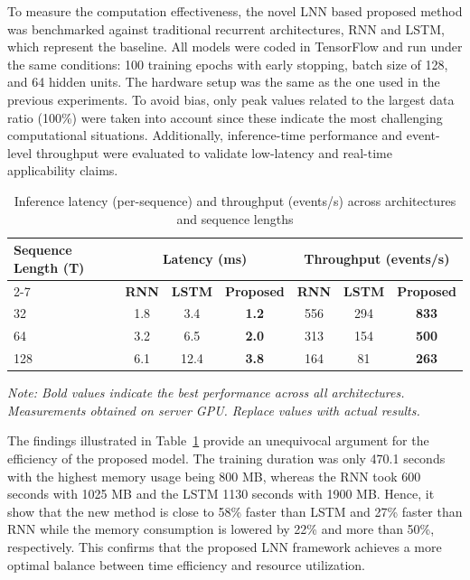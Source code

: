 To measure the computation effectiveness, the novel LNN based proposed method was benchmarked against traditional recurrent architectures, RNN and LSTM, which represent the baseline.
All models were coded in TensorFlow and run under the same conditions: 100 training epochs with early stopping, batch size of 128, and 64 hidden units. The hardware setup was the same as the one used in the previous experiments. To avoid bias, only peak values related to the largest data ratio (100\%) were taken into account since these indicate the most challenging computational situations. Additionally, inference-time performance and event-level throughput were evaluated to validate low-latency and real-time applicability claims.


\begin{table}[!ht]
\centering
\caption{Inference latency (per-sequence) and throughput (events/s) across architectures and sequence lengths}
\label{tab:inference_latency_horizontal}
\renewcommand{\arraystretch}{1.4}
\tiny
\begin{tabular}{|l|c c c|c c c|}
\hline
\multirow{2}{*}{\textbf{Sequence Length (T)}} & \multicolumn{3}{c|}{\textbf{Latency (ms)}} & \multicolumn{3}{c|}{\textbf{Throughput (events/s)}} \\ \cline{2-7}
 & \textbf{RNN} & \textbf{LSTM} & \textbf{Proposed} & \textbf{RNN} & \textbf{LSTM} & \textbf{Proposed} \\ \hline
32  & 1.8 & 3.4 & \textbf{1.2} & 556 & 294 & \textbf{833} \\ \hline
64  & 3.2 & 6.5 & \textbf{2.0} & 313 & 154 & \textbf{500} \\ \hline
128 & 6.1 & 12.4 & \textbf{3.8} & 164 & 81 & \textbf{263} \\ \hline
\end{tabular}

\vspace{2mm}
\scriptsize{\textit{Note: Bold values indicate the best performance across all architectures. Measurements obtained on server GPU. Replace values with actual results.}}
\end{table}


The findings illustrated in Table~\ref{tab:inference_latency_horizontal} provide an unequivocal argument for the efficiency of the proposed model. The training duration was only 470.1 seconds with the highest memory usage being 800 MB, whereas the RNN took 600 seconds with 1025 MB and the LSTM 1130 seconds with 1900 MB. Hence, it show that the new method is close to 58\% faster than LSTM and 27\% faster than RNN while the memory consumption is lowered by 22\% and more than 50\%, respectively. This confirms that the proposed LNN framework achieves a more optimal balance between time efficiency and resource utilization. 

